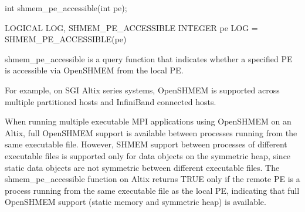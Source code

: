 \synC     
int shmem_pe_accessible(int pe);

\synF
LOGICAL LOG, SHMEM_PE_ACCESSIBLE
INTEGER pe
LOG = SHMEM_PE_ACCESSIBLE(pe)

{
       shmem\_pe\_accessible is  a  query function  that indicates  whether  a
       specified PE is accessible via OpenSHMEM from the local PE.

       For example, on  SGI	Altix  series  systems, OpenSHMEM	is  supported  across multiple
       partitioned hosts and InfiniBand connected hosts.

       When running multiple executable MPI applications using OpenSHMEM on an Altix,
       full OpenSHMEM support is available between processes running from the same
       executable file.	 However, SHMEM support between processes of different
       executable  files  is  supported only for data objects on the symmetric
       heap, since static data objects are  not symmetric  between  different
       executable  files.   The shmem\_pe\_accessible function on Altix returns
       TRUE only if  the  remote  PE  is  a  process  running  from  the  same
       executable  file	 as  the  local PE, indicating that full OpenSHMEM support
       (static memory and symmetric heap) is available.
}
{

\notesB{}
}

\eAPI